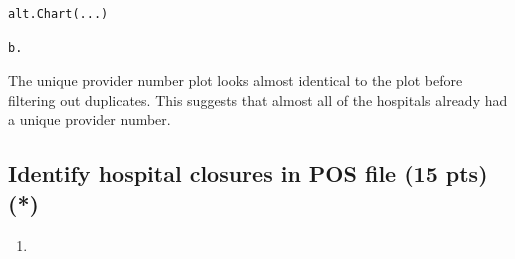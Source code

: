 \documentclass[
  letterpaper,
  DIV=11,
  numbers=noendperiod]{scrartcl}
\providecommand{\tightlist}{%
  \setlength{\itemsep}{0pt}\setlength{\parskip}{0pt}}\usepackage{longtable,booktabs,array}
\begin{document}
\begin{verbatim}
alt.Chart(...)
\end{verbatim}

\begin{verbatim}
b.
\end{verbatim}

The unique provider number plot looks almost identical to the plot
before filtering out duplicates. This suggests that almost all of the
hospitals already had a unique provider number.

\subsection{Identify hospital closures in POS file (15 pts)
(*)}\label{identify-hospital-closures-in-pos-file-15-pts}

\begin{enumerate}
\def\labelenumi{\arabic{enumi}.}
\tightlist
\item
\end{enumerate}
\end{document}
